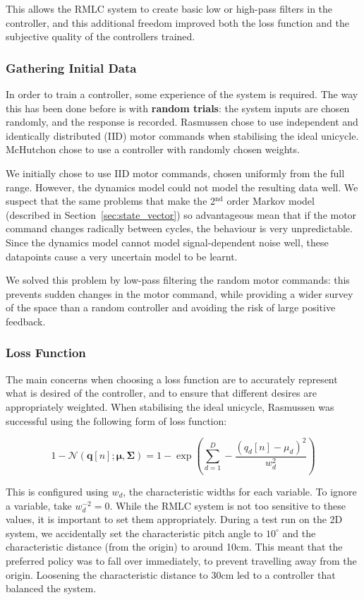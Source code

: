 \documentclass{IIBproject}
\begin{document}
This allows the RMLC system to create basic low or high-pass filters in the
controller, and this additional freedom improved both the loss function and
the subjective quality of the controllers trained.

\subsubsection{Gathering Initial Data}
\label{sec:random_trials}

In order to train a controller, some experience of the system is required. The
way this has been done before is with \textbf{random trials}: the system
inputs are chosen randomly, and the response is recorded.
Rasmussen chose to use independent and identically distributed (IID) motor
commands when stabilising the ideal unicycle. McHutchon chose to use a
controller with randomly chosen weights.

We initially chose to use IID motor commands, chosen uniformly from the full
range. However, the dynamics model could not model the resulting data well. We
suspect that the same problems that make the 2$^\textrm{nd}$ order Markov
model (described in Section~\ref{sec:state_vector}) so advantageous mean that
if the motor command changes radically between cycles, the behaviour is very
unpredictable.  Since the dynamics model cannot model signal-dependent noise
well, these datapoints cause a very uncertain model to be learnt.

We solved this problem by low-pass filtering the random motor commands: this prevents
sudden changes in the motor command, while providing a wider survey of
the space than a random controller and avoiding the risk of large positive
feedback.

\subsubsection{Loss Function}
\label{sec:loss_function}

The main concerns when choosing a loss function are to accurately represent
what is desired of the controller, and to ensure that different desires are
appropriately weighted. When stabilising the ideal unicycle, Rasmussen was
successful using the following form of loss function:

\[
  1 - \mathcal{N}(\boldsymbol{q}[n]; \boldsymbol{\mu}, \boldsymbol{\Sigma})
  = 1 - \exp\left(\sum_{d=1}^D - \frac{(q_d[n] - \mu_d)^2}{w_d^2}\right)
\]

This is configured using $w_d$, the characteristic widths for each variable.
To ignore a variable, take $w_d^{-2} = 0$. While the RMLC system is not too
sensitive to these values, it is important to set them appropriately. During a
test run on the 2D system, we accidentally set the characteristic pitch angle
to $10^\circ$ and the characteristic distance (from the origin) to around
10cm. This meant that the preferred policy was to fall over immediately, to
prevent travelling away from the origin. Loosening the characteristic distance
to 30cm led to a controller that balanced the system.
\end{document}
